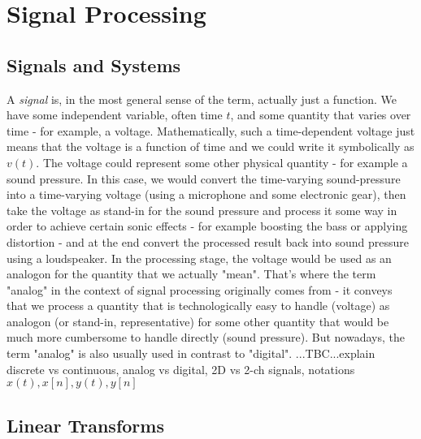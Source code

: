 \chapter{Signal Processing}

\section{Signals and Systems}
A \emph{signal} is, in the most general sense of the term, actually just a function. We have some independent variable, often time $t$, and some quantity that varies over time - for example, a voltage. Mathematically, such a time-dependent voltage just means that the voltage is a function of time and we could write it symbolically as $v(t)$. The voltage could represent some other physical quantity - for example a sound pressure. In this case, we would convert the time-varying sound-pressure into a time-varying voltage (using a microphone and some electronic gear), then take the voltage as stand-in for the sound pressure and process it some way in order to achieve certain sonic effects - for example boosting the bass or applying distortion - and at the end convert the processed result back into sound pressure using a loudspeaker. In the processing stage, the voltage would be used as an analogon for the quantity that we actually "mean". That's where the term "analog" in the context of signal processing originally comes from - it conveys that we process a quantity that is technologically easy to handle (voltage) as analogon (or stand-in, representative) for some other quantity that would be much more cumbersome to handle directly (sound pressure). But nowadays, the term "analog" is also usually used in contrast to "digital". ...TBC...explain discrete vs continuous, analog vs digital, 2D vs 2-ch signals, notations $x(t), x[n], y(t), y[n]$



% 


\section{Linear Transforms}

